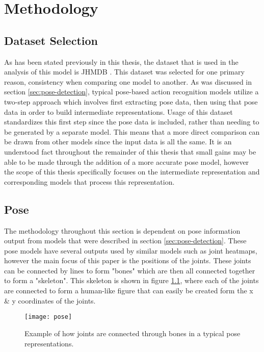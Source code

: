 
\chapter{Methodology}

\label{Methodology}

\section{Dataset Selection}

As has been stated previously in this thesis, the dataset that is used in the analysis of this model is JHMDB \cite{JHMDB}. This dataset was selected for one primary reason, consistency when comparing one model to another. As was discussed in section \ref{sec:pose-detection}, typical pose-based action recognition models utilize a two-step approach which involves first extracting pose data, then using that pose data in order to build intermediate representations. Usage of this dataset standardizes this first step since the pose data is included, rather than needing to be generated by a separate model. This means that a more direct comparison can be drawn from other models since the input data is all the same. It is an understood fact throughout the remainder of this thesis that small gains may be able to be made through the addition of a more accurate pose model, however the scope of this thesis specifically focuses on the intermediate representation and corresponding models that process this representation.

\section{Pose}

The methodology throughout this section is dependent on pose information output from models that were described in section \ref{sec:pose-detection}. These pose models have several outputs used by similar models such as joint heatmaps, however the main focus of this paper is the positions of the joints. These joints can be connected by lines to form "bones" which are then all connected together to form a "skeleton". This skeleton is shown in figure \ref{fig:pose}, where each of the joints are connected to form a human-like figure that can easily be created form the x \& y coordinates of the joints.

\begin{figure}[ht]
	\texttt{[image: pose]}
	\centering
	\caption{Example of how joints are connected through bones in a typical pose representations.}
	\label{fig:pose}
\end{figure}

